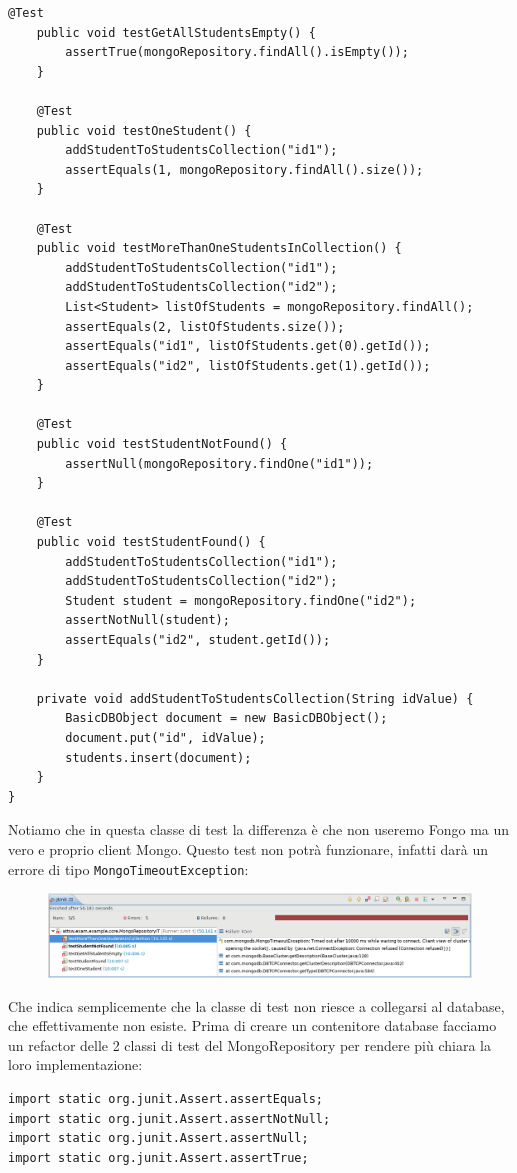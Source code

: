 \begin{enumerate}
\begin{lstlisting}[frame=single]
	@Test
	public void testGetAllStudentsEmpty() {
		assertTrue(mongoRepository.findAll().isEmpty());
	}

	@Test
	public void testOneStudent() {
		addStudentToStudentsCollection("id1");
		assertEquals(1, mongoRepository.findAll().size());
	}

	@Test
	public void testMoreThanOneStudentsInCollection() {
		addStudentToStudentsCollection("id1");
		addStudentToStudentsCollection("id2");
		List<Student> listOfStudents = mongoRepository.findAll();
		assertEquals(2, listOfStudents.size());
		assertEquals("id1", listOfStudents.get(0).getId());
		assertEquals("id2", listOfStudents.get(1).getId());
	}

	@Test
	public void testStudentNotFound() {
		assertNull(mongoRepository.findOne("id1"));
	}

	@Test
	public void testStudentFound() {
		addStudentToStudentsCollection("id1");
		addStudentToStudentsCollection("id2");
		Student student = mongoRepository.findOne("id2");
		assertNotNull(student);
		assertEquals("id2", student.getId());
	}

	private void addStudentToStudentsCollection(String idValue) {
		BasicDBObject document = new BasicDBObject();
		document.put("id", idValue);
		students.insert(document);
	}
}
  \end{lstlisting}
  Notiamo che in questa classe di test la differenza è che non useremo Fongo ma un vero e proprio client Mongo. Questo test non potrà funzionare, infatti darà un errore di tipo \texttt{MongoTimeoutException}:
  \begin{figure}[H]
        \centering
        \includegraphics[width=0.8\linewidth]{4IntegrationWithOtherTool/tutorial/mongoDockerFailTest.png}
    \end{figure}
    Che indica semplicemente che la classe di test non riesce a collegarsi al database, che effettivamente non esiste. Prima di creare un contenitore database facciamo un refactor delle 2 classi di test del MongoRepository per rendere più chiara la loro implementazione:
  \begin{lstlisting}[frame=single]
import static org.junit.Assert.assertEquals;
import static org.junit.Assert.assertNotNull;
import static org.junit.Assert.assertNull;
import static org.junit.Assert.assertTrue;


\end{lstlisting}
\end{enumerate}
